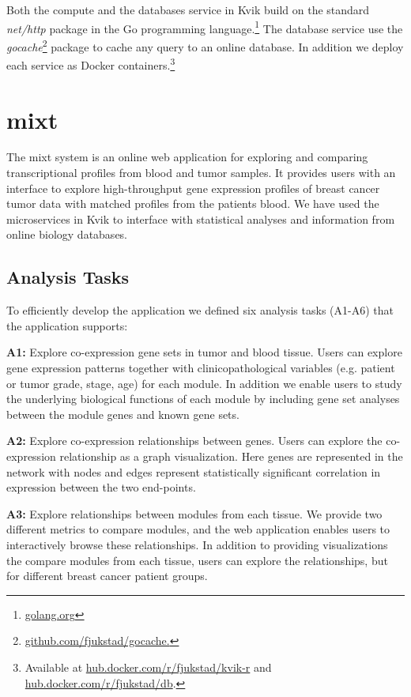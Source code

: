 Both the compute and the databases service in Kvik build on the standard
\emph{net/http} package in the Go programming
language.\footnote{\url{golang.org}} The database service use
the \emph{gocache}\footnote{\url{github.com/fjukstad/gocache.}} package to cache
any query to an online database. In addition we deploy each service as Docker
containers.\footnote{Available at \url{hub.docker.com/r/fjukstad/kvik-r} and
\url{hub.docker.com/r/fjukstad/db}.}

\section{\gls{mixt}}
The \gls{mixt} system is an online web application for exploring and comparing
transcriptional profiles from blood and tumor samples. It provides users with an
interface to explore high-throughput gene expression profiles of breast cancer
tumor data with matched profiles from the patients blood. We have used the
microservices in Kvik to interface with statistical analyses and information
from online biology databases. 

\subsection{Analysis Tasks} 
To efficiently develop
the application we defined six analysis tasks (A1-A6) that the application
supports: 

\textbf{A1:} Explore co-expression gene sets in tumor and blood tissue.  Users
can explore gene expression patterns together with clinicopathological variables
(e.g. patient or tumor grade, stage, age) for each module.  In addition we
enable users to study the underlying biological functions of each module by
including gene set analyses between the module genes and known gene sets. 

\textbf{A2:} Explore co-expression relationships between genes. Users can
explore the co-expression relationship as a graph visualization. 
Here genes are represented in the network with nodes and edges represent 
statistically significant correlation in expression between the two end-points. 

\textbf{A3:} Explore relationships between modules from each tissue. We provide
two different metrics to compare modules, and the web application enables users
to interactively browse these relationships.  In addition to providing
visualizations the compare modules from each tissue, users can explore the
relationships, but for different breast cancer patient groups. 


